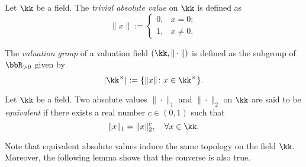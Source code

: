     \begin{example}\label{eg:trivial_absolute_value_on_any_fields}
        Let \(\kk\) be a field.
        The \emph{trivial absolute value} on \(\kk\) is defined as
        \[ \|x\| := \begin{cases}
            0, & x = 0; \\
            1, & x \neq 0.
        \end{cases} \]
    \end{example}

    \begin{definition}\label{def:valuation_group}
        The \emph{valuation group} of a valuation field \((\kk,\|\cdot\|)\) is defined as the subgroup of \(\bbR_{>0}\) given by
        \[ |\kk^\times| := \{\|x\|\colon x \in \kk^\times\}. \]
    \end{definition}

    \begin{definition}\label{def:equivalent_of_absolute_values}
        Let \(\kk\) be a field.
        Two absolute values \(\|\cdot\|_1\) and \(\|\cdot\|_2\) on \(\kk\) are said to be \emph{equivalent} if there exists a real number \(c \in (0,1)\) such that
        \[ \|x\|_1 = \|x\|_2^c, \quad \forall x \in \kk. \]
    \end{definition}

    Note that equivalent absolute values induce the same topology on the field \(\kk\).
    Moreover, the following lemma shows that the converse is also true.

